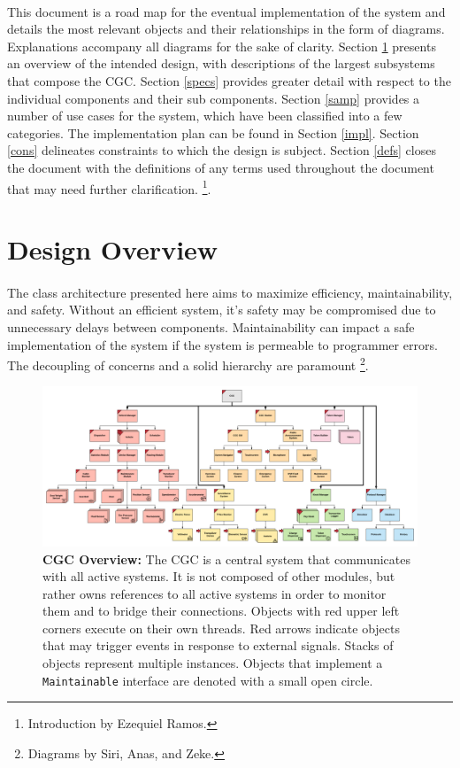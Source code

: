\documentclass[12pt]{article}
\begin{document}
\paragraph{} This document is a road map for the eventual implementation of the system and details the most 
relevant objects and their relationships in the form of diagrams. Explanations accompany all diagrams for the sake of clarity.
Section \ref{over} presents an overview of the intended design, with descriptions of the largest subsystems that compose the CGC. 
Section \ref{specs} provides greater detail with respect to the individual components and their sub components. Section \ref{samp} 
provides a number of use cases for the system, which have been classified into a few categories. The implementation plan 
can be found in Section \ref{impl}. Section \ref{cons} delineates 
constraints to which the design is subject. Section \ref{defs} closes the document with the definitions of any terms used 
throughout the document that may need further clarification.
\footnote{Introduction by Ezequiel Ramos.}.

\section{Design Overview} \label{over}
\paragraph{} The class architecture presented here aims to maximize efficiency, maintainability, and 
safety. Without an efficient system, it's safety may be compromised due to unnecessary 
delays between components. Maintainability can impact a safe implementation of the 
system if the system is permeable to programmer errors. The decoupling of concerns and 
a solid hierarchy are paramount \footnote{Diagrams by Siri, Anas, and Zeke.}.

\begin{figure}[H]
    \centerline{\includegraphics[scale=0.15]{CGC-Design-Overview.png}}
    \caption{\textbf{CGC Overview:} The CGC is a central system that communicates with all active systems. 
    It is not composed of other modules, but rather owns references to all active systems in order to monitor 
    them and to bridge their connections. Objects with red upper left corners execute on their own threads. 
    Red arrows indicate objects that may trigger events in response to external signals. Stacks of objects 
    represent multiple instances. Objects that implement a \texttt{Maintainable} interface are denoted with a small
    open circle.}
  \label{fig:CGCOverview}
\end{figure}    
\end{document}
